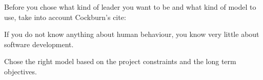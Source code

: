 Before you chose what kind of leader you want to be and what kind of model to use, take into account Cockburn's cite:

\begin{displayquote}
If you do not know anything about human behaviour, you know very little about software development.
\end{displayquote}

Chose the right model based on the project constraints and the long term objectives.